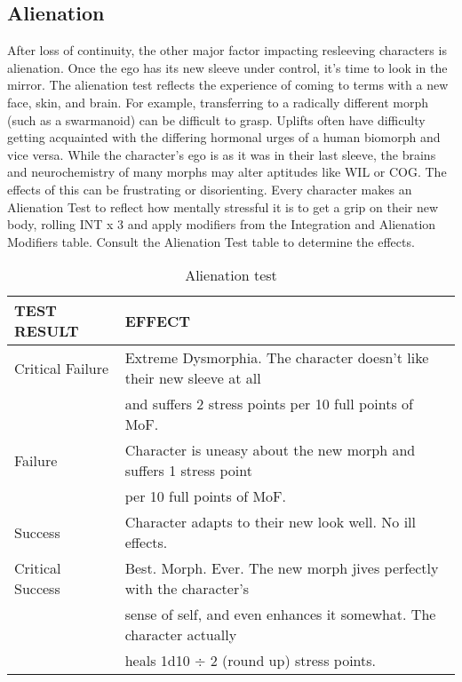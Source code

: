 \subsection{Alienation} 

After loss of continuity, the other major factor impacting resleeving characters is alienation. Once the ego has its new sleeve under control, it's time to look in the mirror. The alienation test reflects the experience of coming to terms with a new face, skin, and brain. For example, transferring to a radically different morph (such as a swarmanoid) can be difficult to grasp. Uplifts often have difficulty getting acquainted with the differing hormonal urges of a human biomorph and vice versa. While the character's ego is as it was in their last sleeve, the brains and neurochemistry of many morphs may alter aptitudes like WIL or COG. The effects of this can be frustrating or disorienting. Every character makes an Alienation Test to reflect how mentally stressful it is to get a grip on their new body, rolling INT x 3 and apply modifiers from the Integration and Alienation Modifiers table. Consult the Alienation Test table to determine the effects. \\ 

\begin{table} \caption{Alienation test} \begin{tabular}{|l|l|} 



\hline

TEST RESULT &EFFECT \\ \hline

Critical Failure &Extreme Dysmorphia. The character doesn’t like their new sleeve at all \\ &and suffers 2 stress points per 10 full points of MoF. \\ \hline

Failure &Character is uneasy about the new morph and suffers 1 stress point \\ &per 10 full points of MoF. \\ \hline

Success &Character adapts to their new look well. No ill effects. \\ \hline

Critical Success &Best. Morph. Ever. The new morph jives perfectly with the character’s \\ &sense of self, and even enhances it somewhat. The character actually \\ &heals 1d10 $\div$ 2 (round up) stress points. \\ \hline

\end{tabular} \end{table} 

